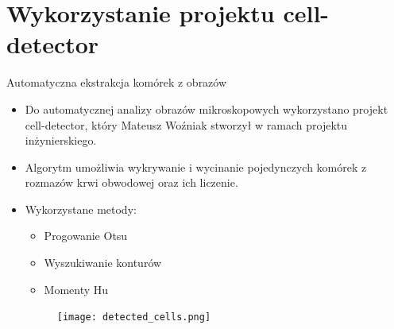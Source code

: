 \documentclass[polish,aspectratio=1610]{beamer}
\begin{document}
    \section{Wykorzystanie projektu cell-detector}
    \begin{frame}{Automatyczna ekstrakcja komórek z obrazów}
        \begin{itemize}
            \item Do automatycznej analizy obrazów mikroskopowych wykorzystano projekt cell-detector, który Mateusz Woźniak stworzył w ramach projektu inżynierskiego.
            \item Algorytm umożliwia wykrywanie i wycinanie pojedynczych komórek z rozmazów krwi obwodowej oraz ich liczenie.
            \item Wykorzystane metody:
            \begin{itemize}
                \item Progowanie Otsu
                \item Wyszukiwanie konturów 
                \item Momenty Hu
            \end{itemize}
            \begin{figure}
                \texttt{[image: detected\_cells.png]}
            \end{figure}
        \end{itemize}
    \end{frame}
\end{document}
